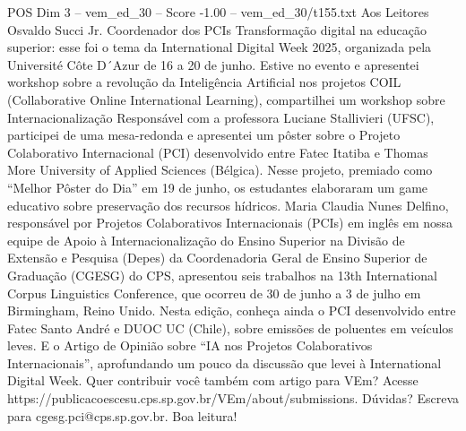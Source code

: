 \begin{textsample}{POS Dim 3 – vem\_ed\_30 – Score -1.00 – vem\_ed\_30/t155.txt}  \label{ex:f3_pos_054}
Aos Leitores Osvaldo Succi Jr.
Coordenador dos PCIs Transformação digital na educação superior: esse foi o tema da International Digital Week 2025, organizada pela Université Côte D´Azur de 16 a 20 de junho.
Estive no evento e apresentei workshop sobre a revolução da Inteligência Artificial nos projetos COIL (Collaborative Online International Learning), compartilhei um workshop sobre Internacionalização Responsável com a professora Luciane Stallivieri (UFSC), participei de uma mesa-redonda e apresentei um pôster sobre o Projeto Colaborativo Internacional (PCI) desenvolvido entre Fatec Itatiba e Thomas More University of Applied Sciences (Bélgica).
Nesse projeto, premiado como “Melhor Pôster do Dia” em 19 de junho, os estudantes elaboraram um game educativo sobre preservação dos recursos hídricos.
Maria Claudia Nunes Delfino, responsável por Projetos Colaborativos Internacionais (PCIs) em inglês em nossa equipe de Apoio à Internacionalização do Ensino Superior na Divisão de Extensão e Pesquisa (Depes) da Coordenadoria Geral de Ensino Superior de Graduação (CGESG) do CPS, apresentou seis trabalhos na 13th International Corpus Linguistics Conference, que ocorreu de 30 de junho a 3 de julho em Birmingham, Reino Unido.
Nesta edição, conheça ainda o PCI desenvolvido entre Fatec Santo André e DUOC UC (Chile), sobre emissões de poluentes em veículos leves.
E o Artigo de Opinião sobre “IA nos Projetos Colaborativos Internacionais”, aprofundando um pouco da discussão que levei à International Digital Week.
Quer contribuir você também com artigo para VEm?
Acesse https://publicacoescesu.cps.sp.gov.br/VEm/about/submissions.
Dúvidas?
Escreva para cgesg.pci@cps.sp.gov.br.
Boa leitura!

\end{textsample}

